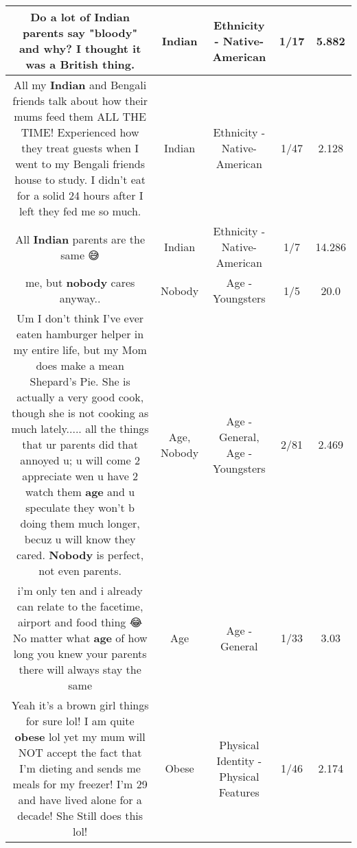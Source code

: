 \documentclass[11pt]{article}
\newlength\mylength
\begin{document}
\begin{center}
\begin{longtable}{|C{.65\mylength}|C{.30\mylength}|C{.12\mylength}|C{.12\mylength}|C{.12\mylength}|}
  \small Do a lot of \textbf{Indian} parents say "bloody" and why? I thought it was a British thing.\normalsize   & Indian & Ethnicity - Native-American & 1/17 & 5.882 \\  \hline
  \small All my \textbf{Indian} and Bengali friends talk about how their mums feed them ALL THE TIME! Experienced how they treat guests when I went to my Bengali friends house to study. I didn't eat for a solid 24 hours after I left they fed me so much.\normalsize   & Indian & Ethnicity - Native-American & 1/47 & 2.128 \\  \hline
  \small All \textbf{Indian} parents are the same 😅\normalsize   & Indian & Ethnicity - Native-American & 1/7 & 14.286 \\  \hline
  \small me, but \textbf{nobody} cares anyway..\normalsize   & Nobody & Age - Youngsters & 1/5 & 20.0 \\  \hline
  \small Um I don't think I've ever eaten hamburger helper in my entire life, but my Mom does make a mean Shepard's Pie. She is actually a very good cook, though she is not cooking as much lately..... all the things that ur parents did that annoyed u; u will come 2 appreciate wen u have 2 watch them \textbf{age} and u speculate they won't b doing them much longer, becuz u will know they cared. \textbf{Nobody} is perfect, not even parents.\normalsize   & Age, Nobody & Age - General, Age - Youngsters & 2/81 & 2.469 \\  \hline
  \small i'm only ten and i already can relate to the facetime, airport  and food thing 😂 No matter what \textbf{age} of how long you knew your parents there will always stay the same\normalsize   & Age & Age - General & 1/33 & 3.03 \\  \hline
  \small Yeah it's a brown girl things for sure lol! I am quite \textbf{obese} lol yet my mum will NOT accept the fact that I'm dieting and sends me meals for my freezer! I'm 29 and have lived alone for a decade! She Still does this lol!\normalsize   & Obese & Physical Identity - Physical Features & 1/46 & 2.174 \\  \hline

\end{longtable}
\end{center}
\end{document}
